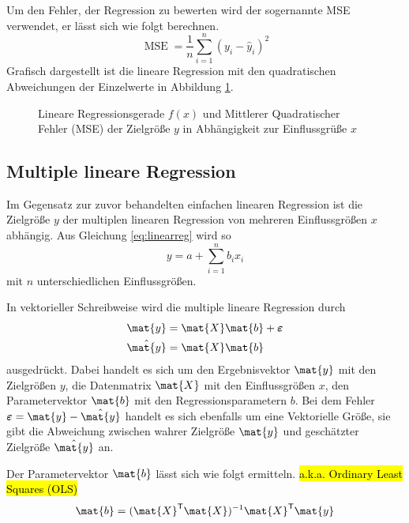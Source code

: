 Um den Fehler, der Regression zu bewerten wird der sogernannte \gls{MSE} verwendet, er lässt sich wie folgt berechnen.
\begin{equation}
    \operatorname{MSE} = \frac{1}{n} \sum _{i=1}^n \left(y_{i}-\hat{y}_i\right)^2
\end{equation}
Grafisch dargestellt ist die lineare Regression mit den quadratischen Abweichungen der Einzelwerte in Abbildung \ref{fig:linearregression}.
\begin{figure} [htb]
    \centering
    
    \caption{Lineare Regressionsgerade $f(x)$ und Mittlerer Quadratischer Fehler (MSE) der Zielgröße $y$ in Abhängigkeit zur Einflussgrüße $x$}
    \label{fig:linearregression}
\end{figure}

\subsection{Multiple lineare Regression}
Im Gegensatz zur zuvor behandelten einfachen linearen Regression ist die Zielgröße $y$ der multiplen linearen Regression von mehreren Einflussgrößen $x​$ abhängig.
Aus Gleichung \ref{eq:linearreg} wird so
\begin{equation}
    y = a + \sum_{i=1}^n b_i x_i
\end{equation}
mit $n$ unterschiedlichen Einflussgrößen.

In vektorieller Schreibweise wird die multiple lineare Regression durch
\begin{subequations}
  \begin{align}
    \mat{y} &= \mat{X} \mat{b} + \boldsymbol{\varepsilon} \\
    \hat{\mat{y}} &= \mat{X} \mat{b}
  \end{align}
\end{subequations}
ausgedrückt.
Dabei handelt es sich um den Ergebnisvektor $\mat{y}$ mit den Zielgrößen $y$, die Datenmatrix $\mat{X}$ mit den Einflussgrößen $x$, den Parametervektor $\mat{b}$ mit den Regressionsparametern $b$.
Bei dem Fehler $\boldsymbol{\varepsilon} = \mat{y} - \hat{\mat{y}}$ handelt es sich ebenfalls um eine Vektorielle Größe, sie gibt die Abweichung zwischen wahrer Zielgröße $\mat{y}$ und geschätzter Zielgröße $\hat{\mat{y}}$ an.

Der Parametervektor $\mat{b}$ lässt sich wie folgt ermitteln. \hl{a.k.a. Ordinary Least Squares (OLS)}
\begin{equation}
  \mat{b} =(\mat{X}^\mathsf{T}\mat{X} )^{-1}\mat{X}^\mathsf{T}\mat{y}
\end{equation}

